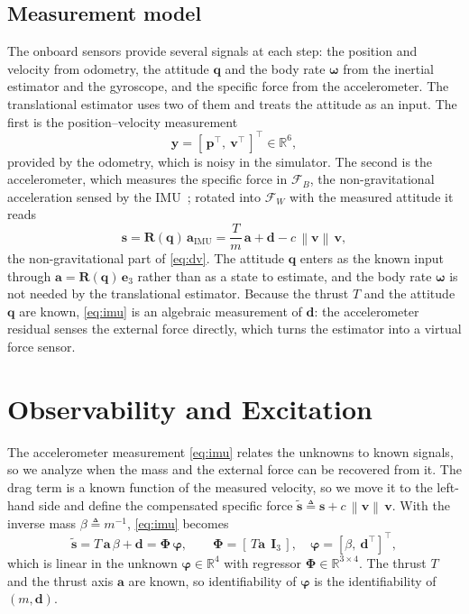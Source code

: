 \documentclass{ieeeaccess}
\newcommand{\R}{\mathbb{R}}
\newcommand{\norm}[1]{\left\| #1 \right\|}
\newcommand{\vect}[1]{\bm{#1}}
\newcommand{\mat}[1]{\mathbf{#1}}
\begin{document}
\subsection{Measurement model}
The onboard sensors provide several signals at each step: the position and
velocity from odometry, the attitude $\vect{q}$ and the body rate
$\vect{\omega}$ from the inertial estimator and the gyroscope, and the specific
force from the accelerometer. The translational estimator uses two of them and
treats the attitude as an input. The first is the position--velocity
measurement
\begin{equation}
\vect{y} = [\,\vect{p}^{\!\top},\ \vect{v}^{\!\top}\,]^{\!\top}\in\R^6 ,
\label{eq:y}
\end{equation}
provided by the odometry, which is noisy in the simulator. The second is the
accelerometer, which measures the specific force in $\mathcal{F}_B$, the
non-gravitational acceleration sensed by the IMU~\cite{forster2015imu}; rotated into
$\mathcal{F}_W$ with the measured attitude it reads
\begin{equation}
\vect{s} = \mat{R}(\vect{q})\,\vect{a}_{\text{IMU}}
         = \frac{T}{m}\,\vect{a} + \vect{d} - c\,\norm{\vect{v}}\,\vect{v},
\label{eq:imu}
\end{equation}
the non-gravitational part of \eqref{eq:dv}. The attitude $\vect{q}$ enters as
the known input through $\vect{a}=\mat{R}(\vect{q})\,\vect{e}_3$ rather than as a
state to estimate, and the body rate $\vect{\omega}$ is not needed by the
translational estimator. Because the thrust $T$ and the attitude $\vect{q}$ are
known, \eqref{eq:imu} is an algebraic measurement of $\vect{d}$: the
accelerometer residual senses the external force directly, which turns the
estimator into a virtual force sensor.

\section{Observability and Excitation}\label{sec:obs}

The accelerometer measurement \eqref{eq:imu} relates the unknowns to known
signals, so we analyze when the mass and the external force can be recovered
from it. The drag term is a known function of the measured velocity, so we move
it to the left-hand side and define the compensated specific force
$\tilde{\vect{s}}\triangleq\vect{s}+c\,\norm{\vect{v}}\,\vect{v}$. With the
inverse mass $\beta\triangleq m^{-1}$, \eqref{eq:imu} becomes
\begin{equation}
\tilde{\vect{s}} = T\,\vect{a}\,\beta + \vect{d}
                 = \mat{\Phi}\,\vect{\varphi},
\qquad
\mat{\Phi} = [\,T\vect{a}\ \ \mat{I}_3\,],\quad
\vect{\varphi}=[\beta,\ \vect{d}^{\!\top}]^{\!\top},
\label{eq:regressor}
\end{equation}
which is linear in the unknown $\vect{\varphi}\in\R^4$ with regressor
$\mat{\Phi}\in\R^{3\times4}$. The thrust $T$ and the thrust axis $\vect{a}$ are
known, so identifiability of $\vect{\varphi}$ is the identifiability of
$(m,\vect{d})$.
\end{document}
